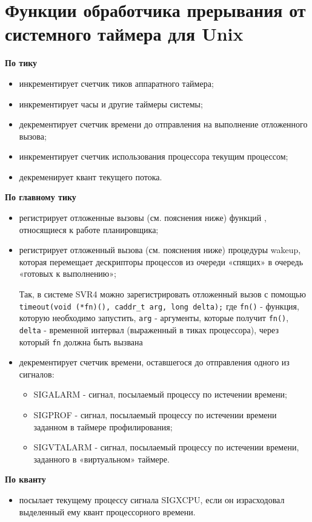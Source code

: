 \documentclass[a4paper,oneside,14pt]{extreport}
\begin{document}
\section*{Функции обработчика прерывания от системного таймера для Unix}
\noindent
\textbf{По тику}
\begin{itemize}
	\item инкрементирует счетчик тиков аппаратного таймера;
	\item инкрементирует часы и другие таймеры системы;
	\item декрементирует счетчик времени до отправления на выполнение отложенного вызова;
	\item инкрементирует счетчик использования процессора текущим процессом;
	\item декременирует квант текущего потока.
\end{itemize}
\textbf{По главному тику}
\begin{itemize}
	\item регистрирует отложенные вызовы (см. пояснения ниже) функций , относящиеся к работе планировщика;
	\item регистрирует отложенный вызова (см. пояснения ниже) процедуры wakeup, которая
	перемещает дескрипторы процессов из очереди «спящих» в
	очередь «готовых к выполнению»;
	
	Так, в системе SVR4 можно зарегистрировать отложенный вызов с помощью
	\texttt{timeout(void (*fn)(), caddr\_t arg, long delta);} где \texttt{fn()} - функция, которую
	необходимо запустить, \texttt{arg} - аргументы, которые получит \texttt{fn()}, \texttt{delta} - временной
	интервал (выраженный в тиках процессора), через который \texttt{fn} должна быть вызвана 
	\item декрементирует счетчик времени, оставшегося до отправления одного из
	сигналов: 
	\begin{itemize}
		\item SIGALARM - сигнал, посылаемый процессу по истечении времени;
		\item SIGPROF - сигнал, посылаемый процессу по истечении времени заданном в таймере профилирования;
		\item SIGVTALARM - сигнал, посылаемый процессу по истечении времени, заданного в «виртуальном» таймере.
	\end{itemize}
\end{itemize}
\textbf{По кванту}
\begin{itemize}
	\item посылает текущему процессу сигнала SIGXCPU, если он
	израсходовал выделенный ему квант процессорного времени.
\end{itemize}
\end{document}
